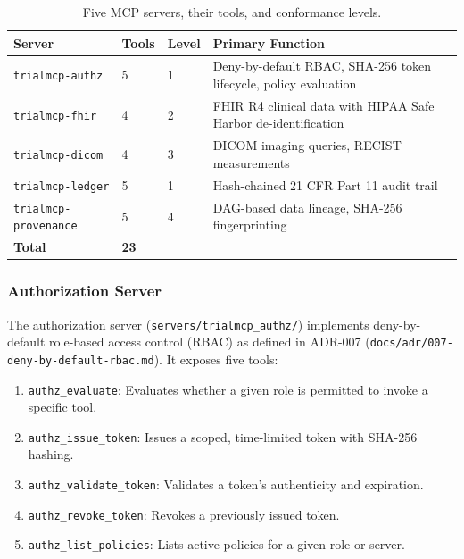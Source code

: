 \begin{table}[H]
\centering
\caption{Five MCP servers, their tools, and conformance levels.}
\label{tab:five-servers}
\footnotesize
\begin{tabularx}{\textwidth}{@{}L{3.2cm}C{0.8cm}C{1.0cm}L{6.8cm}@{}}
\toprule
\textbf{Server} & \textbf{Tools} & \textbf{Level} & \textbf{Primary Function} \\
\midrule
\texttt{trialmcp-authz} & 5 & 1 & Deny-by-default RBAC, SHA-256 token lifecycle, policy evaluation \\
\texttt{trialmcp-fhir} & 4 & 2 & FHIR R4 clinical data with HIPAA Safe Harbor de-identification \\
\texttt{trialmcp-dicom} & 4 & 3 & DICOM imaging queries, RECIST~\cite{eisenhauer2009recist} measurements \\
\texttt{trialmcp-ledger} & 5 & 1 & Hash-chained 21 CFR Part 11 audit trail \\
\texttt{trialmcp-provenance} & 5 & 4 & DAG-based data lineage, SHA-256 fingerprinting \\
\midrule
\textbf{Total} & \textbf{23} & & \\
\bottomrule
\end{tabularx}
\end{table}

\subsubsection{Authorization Server}

The authorization server (\texttt{servers/trialmcp\_authz/}) implements deny-by-default role-based access control (RBAC) as defined in ADR-007 (\texttt{docs/adr/007-deny-by-default-rbac.md}). It exposes five tools:

\begin{enumerate}[leftmargin=*]
\item \texttt{authz\_evaluate}: Evaluates whether a given role is permitted to invoke a specific tool.
\item \texttt{authz\_issue\_token}: Issues a scoped, time-limited token with SHA-256 hashing.
\item \texttt{authz\_validate\_token}: Validates a token's authenticity and expiration.
\item \texttt{authz\_revoke\_token}: Revokes a previously issued token.
\item \texttt{authz\_list\_policies}: Lists active policies for a given role or server.
\end{enumerate}


